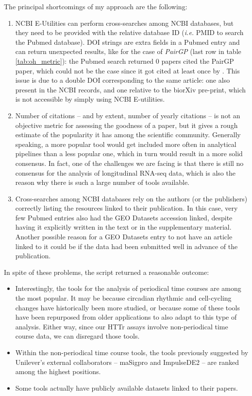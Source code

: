 \documentclass[10pt,a4paper]{article}
\begin{document}
The principal shortcomings of my approach are the following:
\begin{enumerate}
    \item NCBI E-Utilities can perform cross-searches among NCBI databases, but they need to be provided with the relative database ID (\textit{i.e.} PMID to search the Pubmed database). DOI strings are extra fields in a Pubmed entry and can return unexpected results, like for the case of \emph{PairGP} (last row in table \ref{tab:oh_metric}): the Pubmed search returned 0 papers cited the PairGP paper, which could not be the case since it got cited at least once by \citeauthor{ohTemporalDynamicMethods2021}. This issue is due to a double DOI corresponding to the same article: one also present in the NCBI records, and one relative to the biorXiv pre-print, which is not accessible by simply using NCBI E-utilities.
    \item Number of citations -- and by extent, number of yearly citations -- is not an objective metric for assessing the goodness of a paper, but it gives a rough estimate of the popularity it has among the scientific community. Generally speaking, a more popular tool would get included more often in analytical pipelines than a less popular one, which in turn would result in a more solid consensus. In fact, one of the challenges we are facing is that there is still no consensus for the analysis of longitudinal RNA-seq data, which is also the reason why there is such a large number of tools available.
    \item Cross-searches among NCBI databases rely on the authors (or the publishers) correctly listing the resources linked to their publication. In this case, very few Pubmed entries also had the GEO Datasets accession linked, despite having it explicitly written in the text or in the supplementary material. Another possible reason for a GEO Datasets entry to not have an article linked to it could be if the data had been submitted well in advance of the publication.
\end{enumerate}

In spite of these problems, the script returned a reasonable outcome:
\begin{itemize}
    \item Interestingly, the tools for the analysis of periodical time courses are among the most popular. It may be because circadian rhythmic and cell-cycling changes have historically been more studied, or because some of these tools have been repurposed from older applications to also adapt to this type of analysis. Either way, since our HTTr assays involve non-periodical time course data, we can disregard those tools.
    \item Within the non-periodical time course tools, the tools previously suggested by Unilever's external collaborators -- maSigpro and ImpulseDE2 -- are ranked among the highest positions.
    \item Some tools actually have publicly available datasets linked to their papers.
\end{itemize}
\end{document}
